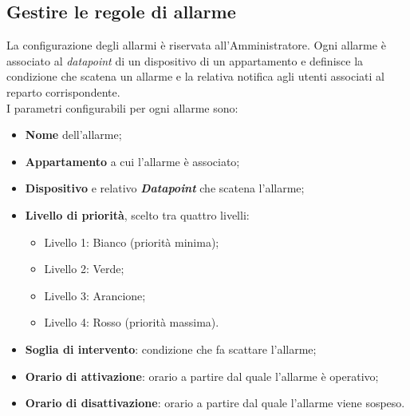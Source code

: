 \documentclass[10pt, letterpaper]{article}
\newcommand{\admin}{Amministratore\xspace}
\begin{document}
\subsection{Gestire le regole di allarme}
La configurazione degli allarmi è riservata all'\admin. Ogni allarme è associato
al \textit{datapoint} di un dispositivo di un appartamento e definisce la condizione 
che scatena un allarme e la relativa notifica agli utenti associati al reparto corrispondente.
\\I parametri configurabili per ogni allarme sono:
\begin{itemize}
    \item \textbf{Nome} dell'allarme;
    \item \textbf{Appartamento} a cui l'allarme è associato;
    \item \textbf{Dispositivo} e relativo \textit{\textbf{Datapoint}} che scatena l'allarme;
    \item \textbf{Livello di priorità}, scelto tra quattro livelli:
          \begin{itemize}
              \item Livello 1: Bianco (priorità minima);
              \item Livello 2: Verde;
              \item Livello 3: Arancione;
              \item Livello 4: Rosso (priorità massima).
          \end{itemize}
    \item \textbf{Soglia di intervento}: condizione che fa scattare l'allarme;
    \item \textbf{Orario di attivazione}: orario a partire dal quale l'allarme è operativo;
    \item \textbf{Orario di disattivazione}: orario a partire dal quale l'allarme viene sospeso.
\end{itemize}
\end{document}
